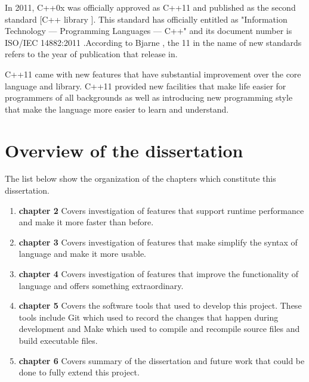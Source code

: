 \documentclass[11pt]{report}
\begin{document}
In 2011, C++0x was officially approved as C++11 and published as the second standard [C++ library ]. This standard has officially entitled as "Information Technology — Programming Languages — C++" and its document number is ISO/IEC 14882:2011 \cite{Josuttis:2012:CppStandard}.According to Bjarne \cite{Stroustrup:2012:Cpp11}, the 11 in the name of new standards refers to the year of publication that release in.

C++11 came with new features that have substantial improvement over the core language and library. C++11 provided new facilities that make life easier for programmers of all backgrounds as well as introducing new programming style  that make the language more easier to learn and understand.


\section{Overview of the dissertation}
\label{sec:Overview}
The list below show the organization of the chapters which constitute this dissertation.

\begin{enumerate}

\item \textbf{chapter 2} Covers investigation of features that support runtime performance and make it more faster than before.

\item \textbf{chapter 3} Covers investigation of features that make simplify the syntax of language and make it more usable.

\item \textbf{chapter 4} Covers investigation of features that improve the functionality of language and offers something extraordinary.

\item \textbf{chapter 5} Covers the software tools that used to develop this project. These tools include Git which used to record the changes that happen during development and Make which used to compile and recompile source files and build executable files.

\item \textbf{chapter 6} Covers summary of the dissertation and future work that could be done to fully extend this project.

\end{enumerate}



\end{document}
